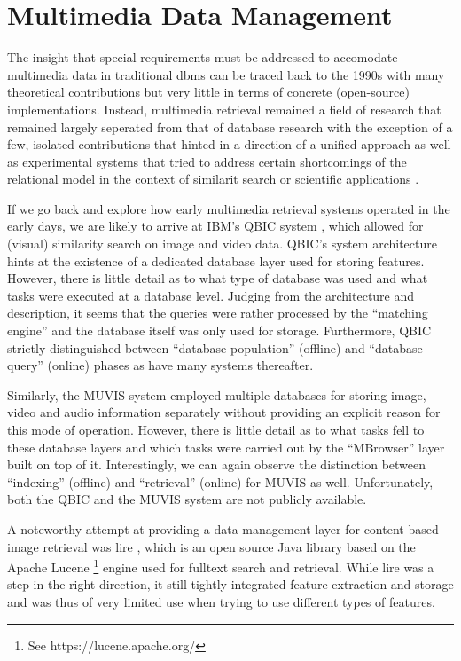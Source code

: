 \chapter{Multimedia Data Management}
\label{chapter:theory_multimedia_database}

The insight that special requirements must be addressed to accomodate multimedia data in traditional \acrshort{dbms} can be traced back to the 1990s \cite{Marcus:1996Foundations,Adjeroh:1997Multimedia} with many theoretical contributions but very little in terms of concrete (open-source) implementations. Instead, multimedia retrieval remained a field of research that remained largely seperated from that of database research with the exception of a few, isolated contributions that hinted in a direction of a unified approach \cite{Chengkai:2005RankSQL,Zhang:2006Boolean} as well as experimental systems that tried to address certain shortcomings of the relational model in the context of similarit search or scientific applications \cite{Silva:2010SimDB,Stonebraker:2013SciDB}.

If we go back and explore how early multimedia retrieval systems operated in the early days, we are likely to arrive at IBM's QBIC system \cite{Flickner:1995Query}, which allowed for (visual) similarity search on image and video data. QBIC's system architecture hints at the existence of a dedicated database layer used for storing features. However, there is little detail as to what type of database was used and what tasks were executed at a database level. Judging from the architecture and description, it seems that the queries were rather processed by the ``matching engine'' and the database itself was only used for storage. Furthermore, QBIC strictly distinguished between ``database population'' (offline) and ``database query'' (online) phases as have many systems thereafter.

Similarly, the MUVIS \cite{Kiranyaz:2003Muvis} system employed multiple databases for storing image, video and audio information separately without providing an explicit reason for this mode of operation. However, there is little detail as to what tasks fell to these database layers and which tasks were carried out by the ``MBrowser'' layer built on top of it. Interestingly, we can again observe the distinction between ``indexing'' (offline) and ``retrieval'' (online) for MUVIS as well. Unfortunately, both the QBIC and the MUVIS system are not publicly available.

A noteworthy attempt at providing a data management layer for content-based image retrieval was \acrfull{lire} \cite{Luc:2008LIRE}, which is an open source Java library based on the Apache Lucene \footnote{See https://lucene.apache.org/} engine used for fulltext search and retrieval. While \acrshort{lire} was a step in the right direction, it still tightly integrated feature extraction and storage and was thus of very limited use when trying to use different types of features.

